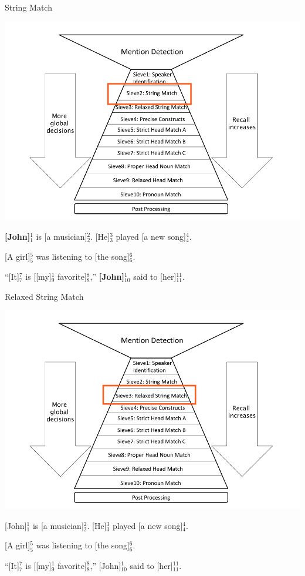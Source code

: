 \documentclass[11pt,a4paper]{beamer}
\begin{document}
\begin{frame}{String Match}

\includegraphics[scale=0.15]{sieve2.png} 
\bigskip

\textbf{[John]$^{1}_{1}$} is [a musician]$^{2}_{2}$. [He]$^{3}_{3}$ played [a new song]$^{4}_{4}$.

[A girl]$^{5}_{5}$ was listening to [the song]$^{6}_{6}$.

“[It]$^{7}_{7}$ is [[my]$^{1}_{9}$ favorite]$^{8}_{8}$,” \textbf{[John]$^{1}_{10}$} said to [her]$^{11}_{11}$.

\end{frame}

\begin{frame}{Relaxed String Match}

\includegraphics[scale=0.15]{sieve3.png} 
\bigskip

[John]$^{1}_{1}$ is [a musician]$^{2}_{2}$. [He]$^{3}_{3}$ played [a new song]$^{4}_{4}$.

[A girl]$^{5}_{5}$ was listening to [the song]$^{6}_{6}$.

“[It]$^{7}_{7}$ is [[my]$^{1}_{9}$ favorite]$^{8}_{8}$,” [John]$^{1}_{10}$ said to [her]$^{11}_{11}$.

\end{frame}
\end{document}
